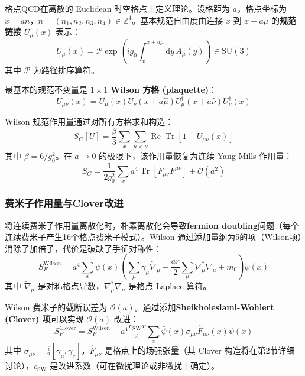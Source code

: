 \documentclass[11pt,a4paper]{ctexart}
\newcommand{\order}[1]{\mathcal{O}(#1)}
\begin{document}
格点QCD在离散的 Euclidean 时空格点上定义理论。设格距为 $a$，格点坐标为 $x = an$，$n=(n_1,n_2,n_3,n_4) \in \mathbb{Z}^4$。基本规范自由度由连接 $x$ 到 $x+a\hat{\mu}$ 的\textbf{规范链接} $U_\mu(x)$ 表示：
\begin{equation}
U_\mu(x) = \mathcal{P} \exp\!\left( i g_0 \int_{x}^{x+a\hat{\mu}} \mathrm{d}y \, A_\mu(y) \right) \in \text{SU}(3)
\end{equation}
其中 $\mathcal{P}$ 为路径排序算符。

最基本的规范不变量是 $1\times 1$ \textbf{Wilson 方格 (plaquette)}：
\begin{equation}
U_{\mu\nu}(x) = U_\mu(x) U_\nu(x+a\hat{\mu}) U_\mu^\dagger(x+a\hat{\nu}) U_\nu^\dagger(x)
\end{equation}

Wilson 规范作用量通过对所有方格求和构造：
\begin{equation}
S_G[U] = \frac{\beta}{3} \sum_x \sum_{\mu<\nu} \operatorname{Re} \operatorname{Tr}[1 - U_{\mu\nu}(x)]
\end{equation}
其中 $\beta = 6/g_0^2$。在 $a \to 0$ 的极限下，该作用量恢复为连续 Yang-Mills 作用量：
\begin{equation}
S_G = \frac{1}{2g_0^2} \sum_x a^4 \operatorname{Tr}[F_{\mu\nu} F^{\mu\nu}] + \order{a^2}
\end{equation}

\subsubsection{费米子作用量与Clover改进}

将连续费米子作用量离散化时，朴素离散化会导致\textbf{fermion doubling}问题（每个连续费米子产生16个格点费米子模式）。Wilson 通过添加量纲为5的项（Wilson项）消除了加倍子，代价是破缺了手征对称性：
\begin{equation}
S_F^{\text{Wilson}} = a^4 \sum_x \bar{\psi}(x) \left( \sum_\mu \gamma_\mu \tilde{\nabla}_\mu - \frac{a r}{2} \sum_\mu \nabla_\mu^* \nabla_\mu + m_0 \right) \psi(x)
\end{equation}
其中 $\tilde{\nabla}_\mu$ 是对称格点导数，$\nabla_\mu^*\nabla_\mu$ 是格点 Laplace 算符。

Wilson 费米子的截断误差为 $\order{a}$。通过添加\textbf{Sheikholeslami-Wohlert (Clover) 项}可以实现 $\order{a}$ 改进：
\begin{equation}
S_F^{\text{Clover}} = S_F^{\text{Wilson}} - a^4 \frac{c_{\text{SW}} r}{4} \sum_x \bar{\psi}(x) \sigma_{\mu\nu} \hat{F}_{\mu\nu}(x) \psi(x)
\end{equation}
其中 $\sigma_{\mu\nu} = \frac{i}{2}[\gamma_\mu, \gamma_\nu]$，$\hat{F}_{\mu\nu}$ 是格点上的场强张量（其 Clover 构造将在第2节详细讨论），$c_{\text{SW}}$ 是改进系数（可在微扰理论或非微扰上确定）。
\end{document}
